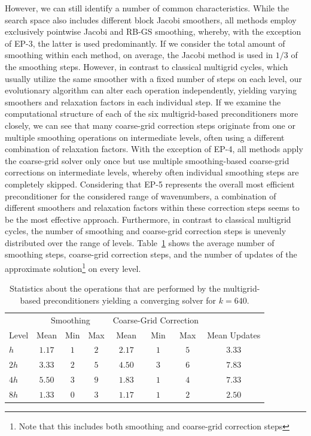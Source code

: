However, we can still identify a number of common characteristics.
While the search space also includes different block Jacobi smoothers, all methods employ exclusively pointwise Jacobi and RB-GS smoothing, whereby, with the exception of EP-3, the latter is used predominantly.
If we consider the total amount of smoothing within each method, on average, the Jacobi method is used in $1/3$ of the smoothing steps.
However, in contrast to classical multigrid cycles, which usually utilize the same smoother with a fixed number of steps on each level, our evolutionary algorithm can alter each operation independently, yielding varying smoothers and relaxation factors in each individual step.
If we examine the computational structure of each of the six multigrid-based preconditioners more closely, we can see that many coarse-grid correction steps originate from one or multiple smoothing operations on intermediate levels, often using a different combination of relaxation factors.
With the exception of EP-4, all methods apply the coarse-grid solver only once but use multiple smoothing-based coarse-grid corrections on intermediate levels, whereby often individual smoothing steps are completely skipped.
Considering that EP-5 represents the overall most efficient preconditioner for the considered range of wavenumbers, a combination of different smoothers and relaxation factors within these correction steps seems to be the most effective approach.
Furthermore, in contrast to classical multigrid cycles, the number of smoothing and coarse-grid correction steps is unevenly distributed over the range of levels.
Table~\ref{table:operations-per-level} shows the average number of smoothing steps, coarse-grid correction steps, and the number of updates of the approximate solution\footnote{Note that this includes both smoothing and coarse-grid correction steps} on every level.
\begin{table}
	\caption{Statistics about the operations that are performed by the multigrid-based preconditioners yielding a converging solver for $k = 640$.}
	\label{table:operations-per-level}
	\centering
	\begin{tabular}{l c c c c c c c}
		\toprule
  		& \multicolumn{3}{c}{Smoothing} & \multicolumn{3}{c}{Coarse-Grid Correction} & \\
		\cmidrule(l){2-4} \cmidrule(l){5-7}
		Level & Mean & Min & Max & Mean & Min & Max & Mean Updates \\
        \midrule
        $h$ & $1.17$ & $1$ & $2$ & $2.17$ & $1$ & $5$ & $3.33$\\
        \midrule
        $2h$ & $3.33$ & $2$ & $5$ & $4.50$ & $3$ & $6$ & $7.83$ \\
        \midrule
        $4h$ & $5.50$ & $3$ & $9$ & $1.83$ & $1$ & $4$ & $7.33$ \\
        \midrule
        $8h$ & $1.33$ & $0$ & $3$ & $1.17$ & $1$ & $2$ & $2.50$ \\
		\bottomrule
	\end{tabular}
\end{table}
